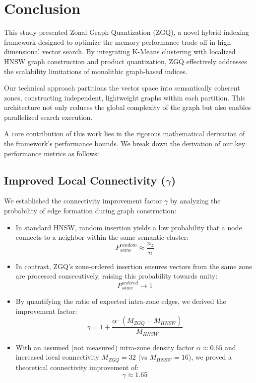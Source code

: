 \documentclass[conference]{IEEEtran}
\begin{document}
\section{Conclusion}
This study presented Zonal Graph Quantization (ZGQ), a novel hybrid indexing framework designed to optimize the memory-performance trade-off in high-dimensional vector search. By integrating K-Means clustering with localized HNSW graph construction and product quantization, ZGQ effectively addresses the scalability limitations of monolithic graph-based indices.

Our technical approach partitions the vector space into semantically coherent zones, constructing independent, lightweight graphs within each partition. This architecture not only reduces the global complexity of the graph but also enables parallelized search execution.

A core contribution of this work lies in the rigorous mathematical derivation of the framework's performance bounds. We break down the derivation of our key performance metrics as follows:

\subsection*{Improved Local Connectivity ($\gamma$)}
We established the connectivity improvement factor $\gamma$ by analyzing the probability of edge formation during graph construction:
\begin{itemize}
    \item In standard HNSW, random insertion yields a low probability that a node connects to a neighbor within the same semantic cluster:
    \begin{equation}
    P_{same}^{random} \approx \frac{n_z}{n}
    \end{equation}
    \item In contrast, ZGQ's zone-ordered insertion ensures vectors from the same zone are processed consecutively, raising this probability towards unity:
    \begin{equation}
    P_{same}^{ordered} \rightarrow 1
    \end{equation}
    \item By quantifying the ratio of expected intra-zone edges, we derived the improvement factor:
    \begin{equation}
    \gamma = 1 + \frac{\alpha \cdot (M_{ZGQ} - M_{HNSW})}{M_{HNSW}}
    \end{equation}
    \item With an assumed (not measured) intra-zone density factor $\alpha \approx 0.65$ and increased local connectivity $M_{ZGQ}=32$ (vs $M_{HNSW}=16$), we proved a theoretical connectivity improvement of:
    \begin{equation}
    \gamma \approx 1.65
    \end{equation}
\end{itemize}
\end{document}
